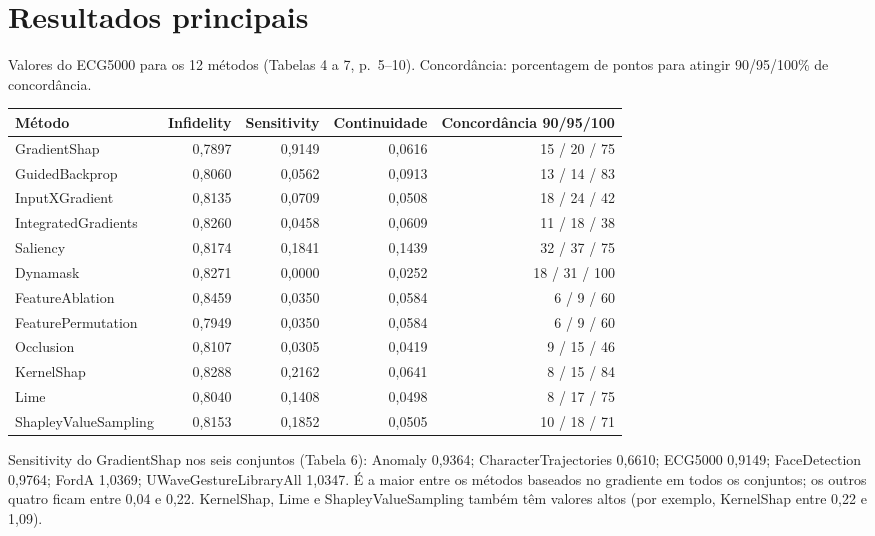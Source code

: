 \documentclass[11pt,a4paper]{article}
\begin{document}
\section{Resultados principais}
Valores do ECG5000 para os 12 métodos (Tabelas 4 a 7, p.~5--10). Concordância: porcentagem de pontos para atingir 90/95/100\% de concordância.
\begin{center}\small
\begin{tabular}{lrrrr}
\toprule
\textbf{Método} & \textbf{Infidelity} & \textbf{Sensitivity} & \textbf{Continuidade} & \textbf{Concordância 90/95/100} \\
\midrule
GradientShap & 0,7897 & 0,9149 & 0,0616 & 15 / 20 / 75 \\
GuidedBackprop & 0,8060 & 0,0562 & 0,0913 & 13 / 14 / 83 \\
InputXGradient & 0,8135 & 0,0709 & 0,0508 & 18 / 24 / 42 \\
IntegratedGradients & 0,8260 & 0,0458 & 0,0609 & 11 / 18 / 38 \\
Saliency & 0,8174 & 0,1841 & 0,1439 & 32 / 37 / 75 \\
\midrule
Dynamask & 0,8271 & 0,0000 & 0,0252 & 18 / 31 / 100 \\
FeatureAblation & 0,8459 & 0,0350 & 0,0584 & 6 / 9 / 60 \\
FeaturePermutation & 0,7949 & 0,0350 & 0,0584 & 6 / 9 / 60 \\
Occlusion & 0,8107 & 0,0305 & 0,0419 & 9 / 15 / 46 \\
\midrule
KernelShap & 0,8288 & 0,2162 & 0,0641 & 8 / 15 / 84 \\
Lime & 0,8040 & 0,1408 & 0,0498 & 8 / 17 / 75 \\
ShapleyValueSampling & 0,8153 & 0,1852 & 0,0505 & 10 / 18 / 71 \\
\bottomrule
\end{tabular}
\end{center}
Sensitivity do GradientShap nos seis conjuntos (Tabela 6): Anomaly 0,9364; CharacterTrajectories 0,6610; ECG5000 0,9149; FaceDetection 0,9764; FordA 1,0369; UWaveGestureLibraryAll 1,0347. É a maior entre os métodos baseados no gradiente em todos os conjuntos; os outros quatro ficam entre 0,04 e 0,22. KernelShap, Lime e ShapleyValueSampling também têm valores altos (por exemplo, KernelShap entre 0,22 e 1,09).
\end{document}
